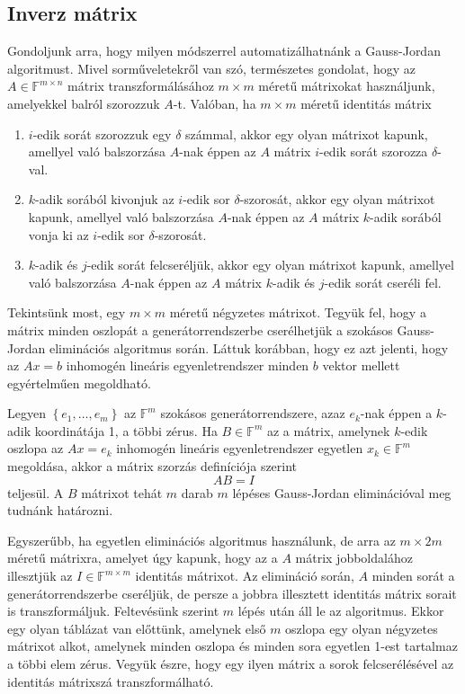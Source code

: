\documentclass[9pt, a4paper, showtrims]{memoir}
\theoremstyle{plain}
\theoremstyle{remark}
\theoremstyle{definition}
\begin{document}
\subsection{Inverz mátrix}
Gondoljunk arra, hogy milyen módszerrel automatizálhatnánk a Gauss-Jordan algoritmust. 
Mivel sorműveletekről van szó, természetes gondolat, hogy az $A\in\mathbb{F}^{m\times n}$
mátrix transzformálásához $m\times m$ méretű mátrixokat használjunk,
amelyekkel balról szorozzuk $A$-t.
Valóban, ha $m\times m$ méretű identitás mátrix 
\begin{enumerate}
    \item 
        $i$-edik sorát szorozzuk egy $\delta$ számmal,
        akkor egy olyan mátrixot kapunk, 
        amellyel való balszorzása $A$-nak éppen az $A$ mátrix 
        $i$-edik sorát szorozza $\delta$-val.
    \item
        $k$-adik sorából kivonjuk az $i$-edik sor $\delta$-szorosát,
        akkor egy olyan mátrixot kapunk, 
        amellyel való balszorzása $A$-nak éppen az $A$ mátrix 
        $k$-adik sorából vonja ki az $i$-edik sor $\delta$-szorosát.
    \item
        $k$-adik és $j$-edik sorát felcseréljük,
        akkor egy olyan mátrixot kapunk, 
        amellyel való balszorzása $A$-nak éppen az $A$ mátrix 
        $k$-adik és $j$-edik sorát cseréli fel.
\end{enumerate}

Tekintsünk most, egy $m\times m$ méretű négyzetes mátrixot.
Tegyük fel, hogy a mátrix minden oszlopát a generátorrendszerbe cserélhetjük
a szokásos Gauss-Jordan eliminációs algoritmus  során.
Láttuk korábban, hogy ez azt jelenti, hogy az $Ax=b$ inhomogén lineáris egyenletrendszer
minden $b$ vektor mellett egyértelműen megoldható.

Legyen $\left\{ e_1,\dots,e_m \right\}$ az $\mathbb{F}^m$ szokásos generátorrendszere,
azaz $e_k$-nak éppen a $k$-adik koordinátája 1, a többi zérus.
Ha $B\in\mathbb{F}^m$ az a mátrix, 
amelynek $k$-edik oszlopa az $Ax=e_k$ inhomogén lineáris egyenletrendszer egyetlen $x_k\in\mathbb{F}^m$ megoldása,
akkor a mátrix szorzás definíciója szerint 
\[
    AB=I
\]
teljesül.
A $B$ mátrixot tehát $m$ darab $m$ lépéses Gauss-Jordan eliminációval  meg tudnánk határozni.

Egyszerűbb, 
ha egyetlen eliminációs algoritmus használunk, de arra az $m\times 2m$ méretű mátrixra,
amelyet úgy kapunk, hogy az a $A$ mátrix jobboldalához illesztjük az $I\in\mathbb{F}^{m\times m}$ identitás mátrixot.
Az elimináció során, 
$A$ minden sorát a generátorrendszerbe cseréljük, de persze a jobbra illesztett identitás
mátrix sorait is transzformáljuk.
Feltevésünk szerint $m$ lépés után áll le az algoritmus.
Ekkor egy  olyan táblázat van előttünk, amelynek első $m$ oszlopa egy olyan négyzetes
mátrixot alkot, amelynek minden oszlopa és minden sora egyetlen 1-est tartalmaz a többi elem zérus. 
Vegyük észre, 
hogy egy ilyen mátrix a sorok felcserélésével az identitás mátrixszá transzformálható.
\end{document}
